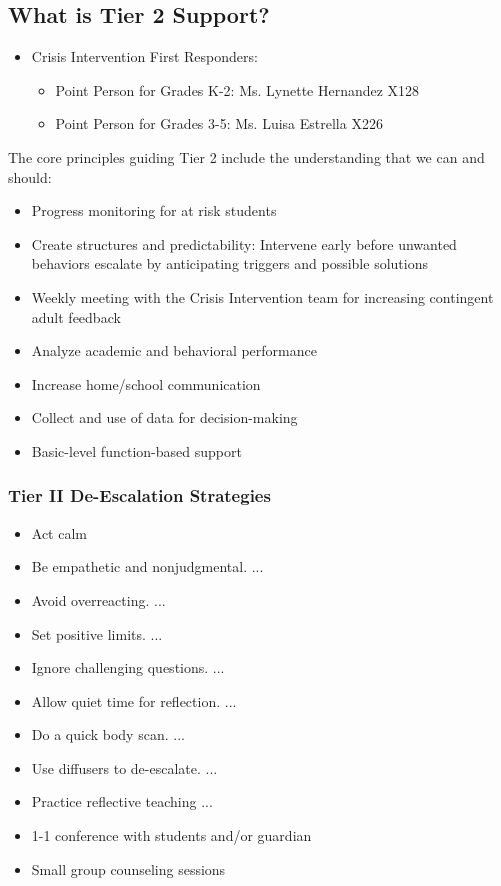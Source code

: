 \documentclass[11pt, letterpaper]{article}
\begin{document}
\subsection{What is Tier 2 Support?}
\begin{itemize}
\item Crisis Intervention First Responders: 
\begin{itemize}
\item Point Person for Grades K-2: Ms. Lynette Hernandez X128
\item Point Person for Grades 3-5: Ms. Luisa Estrella X226
\end{itemize}
\end{itemize}
The core principles guiding Tier 2 include the understanding that we can and should:
\begin{itemize}
\item Progress monitoring for at risk students 
\item Create structures and predictability:  Intervene early before unwanted behaviors escalate by anticipating triggers and possible solutions 
\item Weekly meeting with the Crisis Intervention team for increasing contingent adult feedback 
\item Analyze academic and behavioral performance
\item Increase home/school communication 
\item Collect and use of data for decision-making 
\item Basic-level function-based support
\end{itemize}
\subsubsection{Tier II De-Escalation Strategies}
\begin{itemize}
\item Act calm
\item Be empathetic and nonjudgmental. ...
\item Avoid overreacting. ...
\item Set positive limits. ...
\item Ignore challenging questions. ...
\item Allow quiet time for reflection. ...
\item Do a quick body scan. ...
\item Use diffusers to de-escalate. ...
\item Practice reflective teaching ...
\item 1-1 conference with students and/or guardian
\item Small group counseling sessions
\end{itemize}
\end{document}
